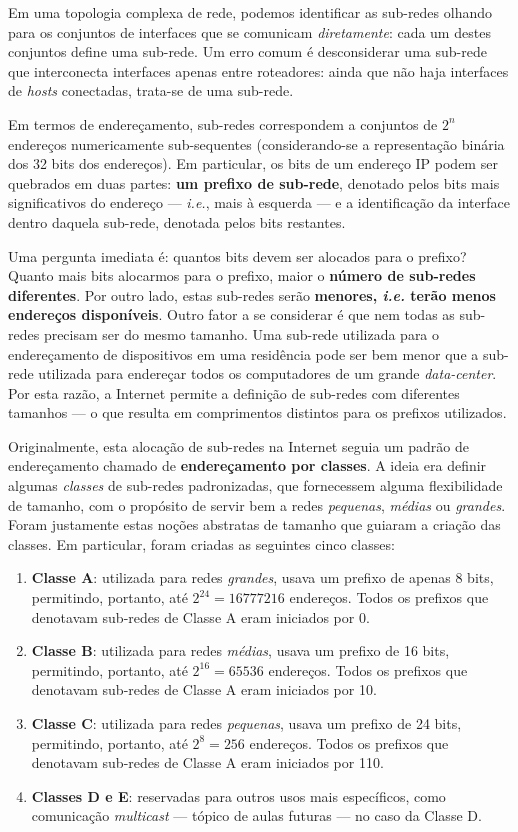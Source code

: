 \documentclass{article}
\begin{document}
Em uma topologia complexa de rede, podemos identificar as sub-redes olhando para os conjuntos de interfaces que se comunicam \textit{diretamente}: cada um destes conjuntos define uma sub-rede. Um erro comum é desconsiderar uma sub-rede que interconecta interfaces apenas entre roteadores: ainda que não haja interfaces de \textit{hosts} conectadas, trata-se de uma sub-rede.

Em termos de endereçamento, sub-redes correspondem a conjuntos de $2^n$ endereços numericamente sub-sequentes (considerando-se a representação binária dos 32 bits dos endereços). Em particular, os bits de um endereço IP podem ser quebrados em duas partes: \textbf{um prefixo de sub-rede}, denotado pelos bits mais significativos do endereço --- \textit{i.e.}, mais à esquerda --- e a identificação da interface dentro daquela sub-rede, denotada pelos bits restantes.

Uma pergunta imediata é: quantos bits devem ser alocados para o prefixo? Quanto mais bits alocarmos para o prefixo, maior o \textbf{número de sub-redes diferentes}. Por outro lado, estas sub-redes serão \textbf{menores, \textit{i.e.} terão menos endereços disponíveis}. Outro fator a se considerar é que nem todas as sub-redes precisam ser do mesmo tamanho. Uma sub-rede utilizada para o endereçamento de dispositivos em uma residência pode ser bem menor que a sub-rede utilizada para endereçar todos os computadores de um grande \textit{data-center}. Por esta razão, a Internet permite a definição de sub-redes com diferentes tamanhos --- o que resulta em comprimentos distintos para os prefixos utilizados.

Originalmente, esta alocação de sub-redes na Internet seguia um padrão de endereçamento chamado de \textbf{endereçamento por classes}. A ideia era definir algumas \textit{classes} de sub-redes padronizadas, que fornecessem alguma flexibilidade de tamanho, com o propósito de servir bem a redes \textit{pequenas}, \textit{médias} ou \textit{grandes}. Foram justamente estas noções abstratas de tamanho que guiaram a criação das classes. Em particular, foram criadas as seguintes cinco classes:
\begin{enumerate}
    \item \textbf{Classe A}: utilizada para redes \textit{grandes}, usava um prefixo de apenas 8 bits, permitindo, portanto, até $2^{24} = 16777216$ endereços. Todos os prefixos que denotavam sub-redes de Classe A eram iniciados por 0.
    \item \textbf{Classe B}: utilizada para redes \textit{médias}, usava um prefixo de 16 bits, permitindo, portanto, até $2^{16} = 65536$ endereços. Todos os prefixos que denotavam sub-redes de Classe A eram iniciados por 10.
    \item \textbf{Classe C}: utilizada para redes \textit{pequenas}, usava um prefixo de 24 bits, permitindo, portanto, até $2^{8} = 256$ endereços. Todos os prefixos que denotavam sub-redes de Classe A eram iniciados por 110.
    \item \textbf{Classes D e E}: reservadas para outros usos mais específicos, como comunicação \textit{multicast} --- tópico de aulas futuras --- no caso da Classe D.
\end{enumerate}
\end{document}
